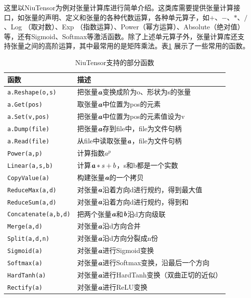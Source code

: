 \parinterval 这里以NiuTensor为例对张量计算库进行简单介绍。这类库需要提供张量计算接口，如张量的声明、定义和张量的各种代数运算，各种单元算子，如$ + $、$ - $、$ \ast $、$ / $、Log （取对数）、Exp （指数运算）、Power（幂方运算）、Absolute（绝对值）等，还有Sigmoid、Softmax等激活函数。除了上述单元算子外，张量计算库还支持张量之间的高阶运算，其中最常用的是矩阵乘法。表\ref{tab:9-2} 展示了一些常用的函数。

\begin{table}[htp]
\centering
\caption{NiuTensor支持的部分函数}
\label{tab:9-2}
\small
\begin{tabular}{l | l}
\rule{0pt}{15pt}     函数 & 描述  \\
\hline
\rule{0pt}{15pt}     \texttt{a.Reshape(o,s)} & 把张量$ {\textbf{\em a}} $变换成阶为o、形状为s的张量  \\
\rule{0pt}{15pt}     \texttt{a.Get(pos)} & 取张量$ {\textbf{\em a}} $中位置为pos的元素  \\
\rule{0pt}{15pt}     \texttt{a.Set(v,pos)} & 把张量$ {\textbf{\em a}} $中位置为pos的元素值设为v  \\
\rule{0pt}{15pt}     \texttt{a.Dump(file)} & 把张量$ {\textbf{\em a}} $存到file中，file为文件句柄  \\
\rule{0pt}{15pt}     \texttt{a.Read(file)} & 从file中读取张量$ {\textbf{\em a}} $，file为文件句柄  \\
\rule{0pt}{15pt}     \texttt{Power(a,p)} & 计算指数$ a^p $  \\
\rule{0pt}{15pt}     \texttt{Linear(a,s,b)} & 计算${\textbf{\em a}}\ast s+b $，s和b都是一个实数  \\
\rule{0pt}{15pt}     \texttt{CopyValue(a)} & 构建张量$ {\textbf{\em a}} $的一个拷贝  \\
\rule{0pt}{15pt}     \texttt{ReduceMax(a,d)} & 对张量$ {\textbf{\em a}} $沿着方向d进行规约，得到最大值  \\
\rule{0pt}{15pt}     \texttt{ReduceSum(a,d)} & 对张量$ {\textbf{\em a}} $沿着方向d进行规约，得到和  \\
\rule{0pt}{15pt}     \texttt{Concatenate(a,b,d)} & 把两个张量$ {\textbf{\em a}} $和$ {\textbf{\em b}} $沿d方向级联  \\
\rule{0pt}{15pt}     \texttt{Merge(a,d)} & 对张量$ {\textbf{\em a}} $沿d方向合并  \\
\rule{0pt}{15pt}     \texttt{Split(a,d,n)} & 对张量$ {\textbf{\em a}} $沿d方向分裂成n份  \\
\rule{0pt}{15pt}     \texttt{Sigmoid(a)} & 对张量${\textbf{\em a}}$进行Sigmoid变换  \\
\rule{0pt}{15pt}     \texttt{Softmax(a)} & 对张量$ {\textbf{\em a}} $进行Softmax变换，沿最后一个方向  \\
\rule{0pt}{15pt}     \texttt{HardTanh(a)} & 对张量$ {\textbf{\em a}} $进行HardTanh变换（双曲正切的近似）  \\
\rule{0pt}{15pt}     \texttt{Rectify(a)} & 对张量$ {\textbf{\em a}} $进行ReLU变换  \\
\end{tabular}
\end{table}

